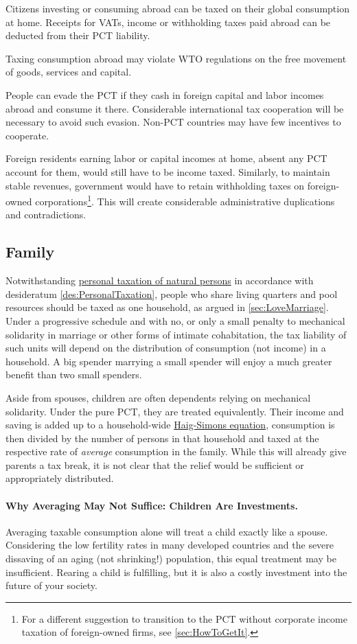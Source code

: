 Citizens investing or consuming abroad can be taxed on their global consumption at home. Receipts for VATs, income or withholding taxes paid abroad can be deducted from their PCT liability.

Taxing consumption abroad may violate WTO regulations on the free movement of goods, services and capital.

People can evade the PCT if they cash in foreign capital and labor incomes abroad and consume it there. Considerable international tax cooperation will be necessary to avoid such evasion. Non-PCT countries may have few incentives to cooperate.

Foreign residents earning labor or capital incomes at home, absent any PCT account for them, would still have to be income taxed. Similarly, to maintain stable revenues, government would have to retain withholding taxes on foreign-owned corporations\footnote{For a different suggestion to transition to the PCT without corporate income taxation of foreign-owned firms, see \autoref{sec:HowToGetIt}.}. This will create considerable administrative duplications and contradictions.

\subsection{Family} Notwithstanding \hyperref[des:PersonalTaxation]{personal taxation of natural persons} in accordance with desideratum \ref{des:PersonalTaxation}, people who share living quarters and pool resources should be taxed as one household, as argued in \autoref{sec:LoveMarriage}. Under a progressive schedule and with no, or only a small penalty to mechanical solidarity in marriage or other forms of intimate cohabitation, the tax liability of such units will depend on the distribution of consumption (not income) in a household. A big spender marrying a small spender will enjoy a much greater benefit than two small spenders.

Aside from spouses, children are often dependents relying on mechanical solidarity. Under the pure PCT, they are treated equivalently. Their income and saving is added up to a household-wide \hyperref[eq:HaigSimons]{Haig-Simons equation}, consumption is then divided by the number of persons in that household and taxed at the respective rate of \emph{average} consumption in the family. While this will already give parents a tax break, it is not clear that the relief would be sufficient or appropriately distributed.

\paragraph{Why Averaging May Not Suffice: Children Are Investments.} Averaging taxable consumption alone will treat a child exactly like a spouse. Considering the low fertility rates in many developed countries and the severe dissaving of an aging (not shrinking!) population, this equal treatment may be insufficient. Rearing a child is fulfilling, but it is also a costly investment into the future of your society.

